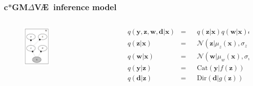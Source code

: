 \documentclass[final]{beamer}
\newcommand{\x}{\mathbf{x}}
\newcommand{\z}{\mathbf{z}}
\newcommand{\y}{\mathbf{y}}
\newcommand{\w}{\mathbf{w}}
\newcommand{\dd}{\mathbf{d}}
\newcommand{\NN}{\mathcal{N}}
\newcommand{\gmvae}{c$\ast$GM$\Delta$V\AE~}
\begin{document}
\begin{frame}
\frametitle{\gmvae inference model}
\begin{columns}[T]
\begin{column}{0.5\linewidth}
\begin{figure}[h]
\centering
\includegraphics[width=0.4\textwidth]{plots/dirichlet_gmm_q.gv.png}
\end{figure}
\end{column}

\begin{column}{0.5\linewidth}
{\tiny
\begin{equation}
\label{eq:gmmqfact}
\begin{aligned}
&q(\y, \z, \w, \dd | \x) &=& 
&q(\z | \x) q(\w | \x) q(\y | \z) q(\dd | \z) \\
&q(\z | \x) &=& &\NN(\z | \mu_z(\x), \sigma_z(\x)) \\
&q(\w | \x) &=& &\NN(\w | \mu_w(\x), \sigma_w(\x)) \\
&q(\y | \z) &=& &\text{Cat}(\y | f(\z)) \\
&q(\dd | \z) &=& &\text{Dir}(\dd | g(\z))
\end{aligned}
\end{equation}
}
\end{column}
\end{columns}
\end{frame}
\end{document}

